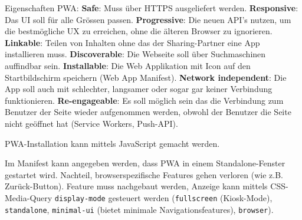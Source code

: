 \documentclass[10pt,landscape]{article}
\begin{document}
\begin{multicols}{2}
        Eigenschaften PWA: \textbf{Safe}: Muss über HTTPS ausgeliefert werden.
        \textbf{Responsive}: Das UI soll für alle Grössen passen.
        \textbf{Progressive}: Die neuen API’s nutzen, um die bestmögliche UX zu erreichen, ohne die älteren Browser zu ignorieren.
        \textbf{Linkable}: Teilen von Inhalten ohne das der Sharing-Partner eine App installieren muss.
        \textbf{Discoverable}: Die Webseite soll über Suchmaschinen auffindbar sein.
        \textbf{Installable}: Die Web Applikation mit Icon auf den Startbildschirm speichern (Web App Manifest).
        \textbf{Network independent}: Die App soll auch mit schlechter, langsamer oder sogar gar keiner Verbindung funktionieren.
        \textbf{Re-engageable}: Es soll möglich sein das die Verbindung zum Benutzer der Seite wieder aufgenommen werden, obwohl der Benutzer die Seite nicht geöffnet hat (Service Workers, Push-API).

        PWA-Installation kann mittels JavaScript gemacht werden.

        Im Manifest kann angegeben werden, dass PWA in einem Standalone-Fenster gestartet wird.
        Nachteil, browserspezifische Features gehen verloren (wie z.B. Zurück-Button).
        Feature muss nachgebaut werden, Anzeige kann mittels CSS-Media-Query \lstinline{display-mode} gesteuert werden (\lstinline{fullscreen} (Kiosk-Mode), \lstinline{standalone}, \lstinline{minimal-ui} (bietet minimale Navigationsfeatures), \lstinline{browser}).
    \end{multicols}
\end{document}
